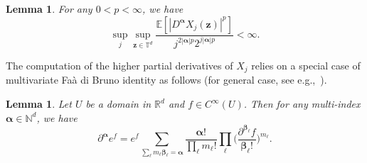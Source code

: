 \documentclass[12pt]{amsart}
\newtheorem{lemma}[theorem]{Lemma}
\theoremstyle{definition}
\theoremstyle{remark}
\newcommand{\bz}{\boldsymbol{z}}
\newcommand{\R}{\mathbb{R}}
\newcommand{\N}{\mathbb{N}}
\newcommand{\E}{\mathbb{E}}
\newcommand{\T}{\mathbb{T}}
\numberwithin{equation}{section}
\begin{document}
\begin{lemma}\label{lemma:p-moment-higher-derivatives-Xj}
For any $0<p<\infty$, we have
\[
\sup_{j}\sup_{\bz\in \T^d}\frac{\E[|D^{\boldsymbol{\alpha}} X_j(\bz)|^p]}{j^{2|\boldsymbol{\alpha}|p}2^{j|\boldsymbol{\alpha}|p}}<\infty.
\]
\end{lemma}

The computation of the higher partial derivatives of $X_j$ relies on a special case of multivariate Faà di Bruno identity as follows (for general case, see e.g.,~\cite[Appendix~A.2]{MV11}).
\begin{lemma}\label{lemma:Faa-di-Bruno}
	Let $U$ be a domain in $\R^d$ and $f\in C^\infty(U)$. Then for any multi-index $\boldsymbol{\alpha}\in \N^d$, we have
	\[
		\partial^{\boldsymbol{\alpha}} e^f=e^f\sum_{\sum_\ell m_\ell \boldsymbol{\beta}_\ell=\boldsymbol{\alpha}} \frac{\boldsymbol{\alpha}!}{\prod_\ell m_\ell!}\prod_{\ell} \bigg(\frac{\partial^{\boldsymbol{\beta}_\ell}f}{\boldsymbol{\beta}_\ell!}\bigg)^{m_\ell}.
	\]
\end{lemma}
\end{document}
